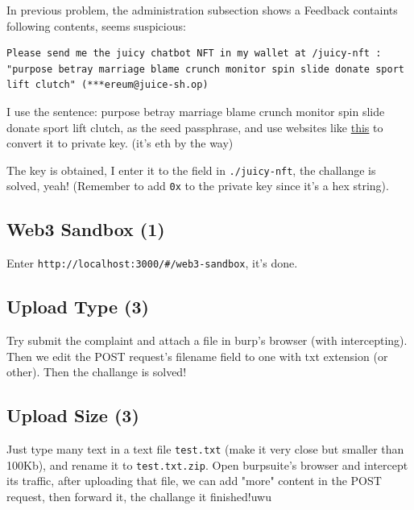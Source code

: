 \documentclass[12pt]{article}
\begin{document}
In previous problem, the administration subsection shows a Feedback containts following contents, seems suspicious:
\begin{Verbatim}[breaklines]
Please send me the juicy chatbot NFT in my wallet at /juicy-nft : "purpose betray marriage blame crunch monitor spin slide donate sport lift clutch" (***ereum@juice-sh.op)
\end{Verbatim}

I use the sentence: purpose betray marriage blame crunch monitor spin slide donate sport lift clutch, as the seed passphrase, and use websites like \href{https://privatekeyfinder.io/mnemonic-converter/}{this} to convert it to private key. (it's eth by the way)

The key is obtained, I enter it to the field in \texttt{./juicy-nft}, the challange is solved, yeah! (Remember to add \texttt{0x} to the private key since it's a hex string).

\subsection{Web3 Sandbox (1)}
Enter \texttt{http://localhost:3000/\#/web3-sandbox}, it's done.

\subsection{Upload Type (3)}
Try submit the complaint and attach a file in burp's browser (with intercepting). Then we edit the POST request's filename field to one with txt extension (or other). Then the challange is solved!

\subsection{Upload Size (3)}
Just type many text in a text file \texttt{test.txt} (make it very close but smaller than 100Kb), and rename it to \texttt{test.txt.zip}. Open burpsuite's browser and intercept its traffic, after uploading that file, we can add "more" content in the POST request, then forward it, the challange it finished!uwu
\end{document}
